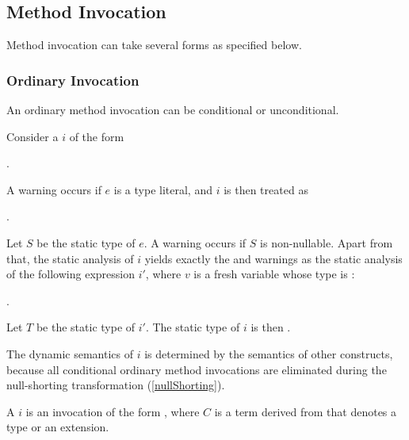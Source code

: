 \documentclass[makeidx]{article}
\begin{document}
{\subsection{Method Invocation}

\LMHash{}%
Method invocation can take several forms as specified below.


\subsubsection{Ordinary Invocation}

\LMHash{}%
An ordinary method invocation can be conditional or unconditional.

\LMHash{}%
Consider a
%
$i$ of the form

\noindent
{}.


\LMHash{}%
A warning occurs if $e$ is a type literal,
and $i$ is then treated as

\noindent
{}.

\LMHash{}%
Let $S$ be the static type of $e$.
A warning occurs if $S$ is non-nullable.
Apart from that,
the static analysis of $i$ yields
exactly the  and warnings as
the static analysis of the following expression $i'$,
where $v$ is a fresh variable whose type is :

\noindent
{}.

\noindent
Let $T$ be the static type of $i'$.
The static type of $i$ is then .

\LMHash{}%
The dynamic semantics of $i$ is determined by the semantics of other constructs,
because all conditional ordinary method invocations are eliminated during
the null-shorting transformation
(\ref{nullShorting}).
\EndCase

\LMHash{}%
A 
$i$ is an invocation of the form
%
,
where $C$ is a term derived from 
that denotes a type or an extension.

}
\end{document}
